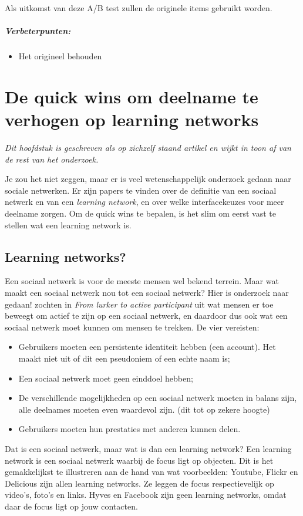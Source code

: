 \documentclass[a4paper, 10pt, pdftex]{report}
\begin{document}
      Als uitkomst van deze A/B test zullen de originele items gebruikt worden.

    \paragraph{\textbf{Verbeterpunten:}}
      \begin{itemize}
        \item Het origineel behouden
      \end{itemize}

  \newpage
  \chapter{De quick wins om deelname te verhogen op learning networks}
    \emph{Dit hoofdstuk is geschreven als op zichzelf staand artikel en wijkt in toon af van de rest van het onderzoek.}

    Je zou het niet zeggen, maar er is veel wetenschappelijk onderzoek gedaan naar sociale netwerken. Er zijn papers te vinden over de definitie van een sociaal netwerk en van een \emph{learning network}, en over welke interfacekeuzes voor meer deelname zorgen. Om de quick wins te bepalen, is het slim om eerst vast te stellen wat een learning network is.

    \section{Learning networks?}
    Een sociaal netwerk is voor de meeste mensen wel bekend terrein. Maar wat maakt een sociaal netwerk nou tot een sociaal netwerk? Hier is onderzoek naar gedaan! \cite{Sloep2009} zochten in \emph{From lurker to active participant} uit wat mensen er toe beweegt om actief te zijn op een sociaal netwerk, en daardoor dus ook wat een sociaal netwerk moet kunnen om mensen te trekken. De vier vereisten:
      \begin{itemize}
        \item Gebruikers moeten een persistente identiteit hebben (een account). Het maakt niet uit of dit een pseudoniem of een echte naam is;
        \item Een sociaal netwerk moet geen einddoel hebben;
        \item De verschillende mogelijkheden op een sociaal netwerk moeten in balans zijn, alle deelnames moeten even waardevol zijn. (dit tot op zekere hoogte)
        \item Gebruikers moeten hun prestaties met anderen kunnen delen.
      \end{itemize}
    Dat is een sociaal netwerk, maar wat is dan een learning network? Een learning network is een sociaal netwerk waarbij de focus ligt op objecten. Dit is het gemakkelijkst te illustreren aan de hand van wat voorbeelden: Youtube, Flickr en Delicious zijn allen learning networks. Ze leggen de focus respectievelijk op video's, foto's en links. Hyves en Facebook zijn geen learning networks, omdat daar de focus ligt op jouw contacten.
\end{document}
